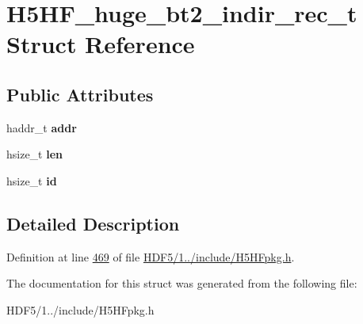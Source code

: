 \hypertarget{struct_h5_h_f__huge__bt2__indir__rec__t}{}\section{H5\+H\+F\+\_\+huge\+\_\+bt2\+\_\+indir\+\_\+rec\+\_\+t Struct Reference}
\label{struct_h5_h_f__huge__bt2__indir__rec__t}
\subsection*{Public Attributes}
\begin{DoxyCompactItemize}
\item 
\mbox{\label{struct_h5_h_f__huge__bt2__indir__rec__t_a242bbf9147921ccace9e0f39d95e8412}} 
haddr\+\_\+t {\bfseries addr}
\item 
\mbox{\label{struct_h5_h_f__huge__bt2__indir__rec__t_a915780a9ac0f8f5c16adc995838425f8}} 
hsize\+\_\+t {\bfseries len}
\item 
\mbox{\label{struct_h5_h_f__huge__bt2__indir__rec__t_ab77325efe2c4f4571d99ca57f941ab3e}} 
hsize\+\_\+t {\bfseries id}
\end{DoxyCompactItemize}


\subsection{Detailed Description}


Definition at line \hyperlink{_h_d_f5_21_810_81_2include_2_h5_h_fpkg_8h_source_l00469}{469} of file \hyperlink{_h_d_f5_21_810_81_2include_2_h5_h_fpkg_8h_source}{H\+D\+F5/1../include/\+H5\+H\+Fpkg.\+h}.



The documentation for this struct was generated from the following file\+:\begin{DoxyCompactItemize}
\item 
H\+D\+F5/1../include/\+H5\+H\+Fpkg.\+h\end{DoxyCompactItemize}
